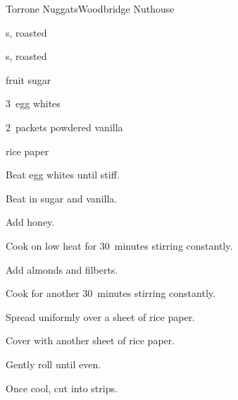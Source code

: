 \begin{recipe}{Torrone Nuggats}{Woodbridge Nuthouse}{}

\begin{ingredients}
\item {} 
\item {} s, roasted
\item {} s, roasted
\item {} fruit sugar
\item 3~egg whites
\item 2~packets powdered vanilla
\item rice paper
\end{ingredients}

\begin{directions}
\item Beat egg whites until stiff.
\item Beat in sugar and vanilla.
\item Add honey.
\item Cook on low heat for 30~minutes stirring constantly.
\item Add almonds and filberts.
\item Cook for another 30~minutes stirring constantly.
\item Spread uniformly over a sheet of rice paper.
\item Cover with another sheet of rice paper.
\item Gently roll until even.
\item Once cool, cut into strips.
\end{directions}

\end{recipe}
